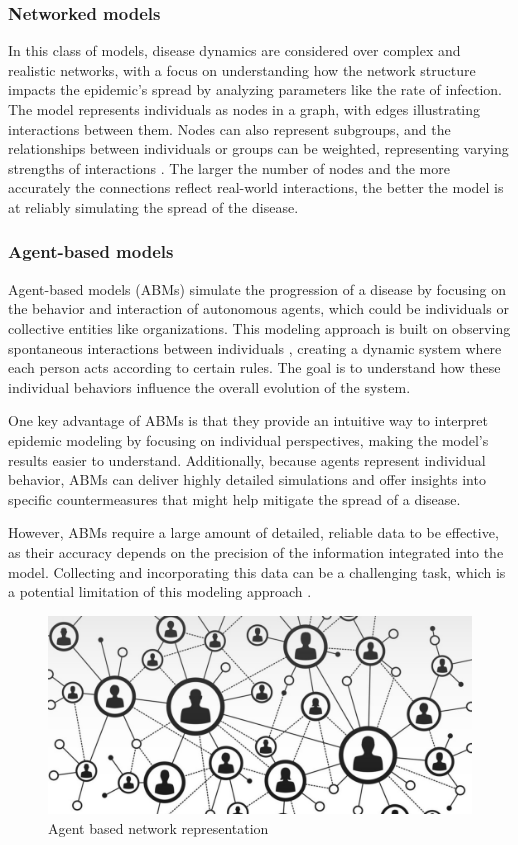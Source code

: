 \subsubsection{Networked models}
In this class of models, disease dynamics are considered over complex and realistic networks, with a focus on understanding how the network structure impacts the epidemic's spread by analyzing parameters like the rate of infection. The model represents individuals as nodes in a graph, with edges illustrating interactions between them. Nodes can also represent subgroups, and the relationships between individuals or groups can be weighted, representing varying strengths of interactions \cite{Newman2002,VanMieghem2009}. The larger the number of nodes and the more accurately the connections reflect real-world interactions, the better the model is at reliably simulating the spread of the disease.


\subsubsection{Agent-based models}
Agent-based models (ABMs) simulate the progression of a disease by focusing on the behavior and interaction of autonomous agents, which could be individuals or collective entities like organizations. This modeling approach is built on observing spontaneous interactions between individuals \cite{Tizzoni2014}, creating a dynamic system where each person acts according to certain rules. The goal is to understand how these individual behaviors influence the overall evolution of the system.

One key advantage of ABMs is that they provide an intuitive way to interpret epidemic modeling by focusing on individual perspectives, making the model's results easier to understand. Additionally, because agents represent individual behavior, ABMs can deliver highly detailed simulations and offer insights into specific countermeasures that might help mitigate the spread of a disease.

However, ABMs require a large amount of detailed, reliable data to be effective, as their accuracy depends on the precision of the information integrated into the model. Collecting and incorporating this data can be a challenging task, which is a potential limitation of this modeling approach \cite{Hernandez_Vargas_2022}.
\begin{figure}
	\centering
	\includegraphics[width=0.5\linewidth]{0_introduction/images_introduction/agent_based}
	\caption[Agent based network representation]{Agent based network representation}
	\label{fig:agentbased}
\end{figure}



